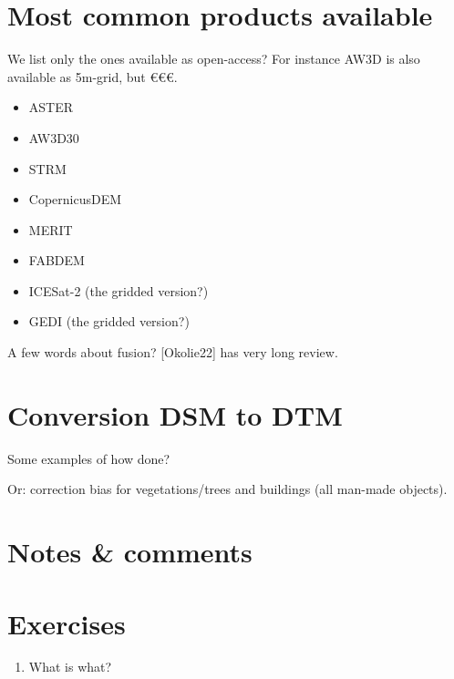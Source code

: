 %
\section[Most common products]{Most common products available}

We list only the ones available as open-access?
For instance AW3D is also available as 5m-grid, but €€€.

\begin{itemize}
  \item ASTER
  \item AW3D30
  \item STRM
  \item CopernicusDEM
  \item MERIT
  \item FABDEM
  \item ICESat-2 (the gridded version?)
  \item GEDI (the gridded version?)
\end{itemize}

A few words about fusion? [Okolie22] has very long review.


%
\section{Conversion DSM to DTM}

Some examples of how done?

Or: correction bias for vegetations/trees and buildings (all man-made objects).

%
\section{Notes \& comments}


%
\section{Exercises}

\begin{enumerate}
  \item What is what?
\end{enumerate}
